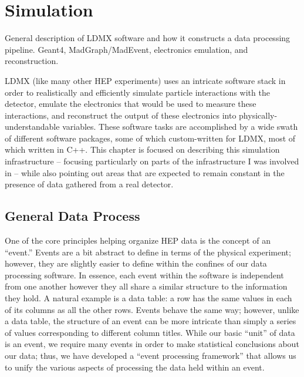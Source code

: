 \chapter{Simulation}
\label{chapter:ldmx:simulation}

\begin{todoenv}
  General description of LDMX software and how it constructs a data processing
    pipeline. Geant4, MadGraph/MadEvent, electronics emulation, and reconstruction.
\end{todoenv}

LDMX (like many other HEP experiments) uses an intricate software stack in order to realistically and efficiently simulate particle interactions with the detector, emulate the electronics that would be used to measure these interactions, and reconstruct the output of these electronics into physically-understandable variables.
These software tasks are accomplished by a wide swath of different software packages, some of which custom-written for LDMX, most of which written in C++.
This chapter is focused on describing this simulation infrastructure -- focusing particularly on parts of the infrastructure I was involved in -- while also pointing out areas that are expected to remain constant in the presence of data gathered from a real detector.

\section{General Data Process}
One of the core principles helping organize HEP data is the concept of an ``event.''
Events are a bit abstract to define in terms of the physical experiment; however, they are slightly easier to define within the confines of our data processing software.
In essence, each event within the software is independent from one another however they all share a similar structure to the information they hold. A natural example is a data table: a row has the same values in each of its columns as all the other rows. Events behave the same way; however, unlike a data table, the structure of an event can be more intricate than simply a series of values corresponding to different column titles.
While our basic ``unit'' of data is an event, we require many events in order to make statistical conclusions about our data; thus, we have developed a ``event processing framework'' that allows us to unify the various aspects of processing the data held within an event.


